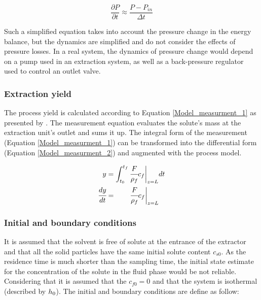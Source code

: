 \documentclass[../Article_Model_Parameters.tex]{subfiles}
\begin{document}
		{\footnotesize
			\begin{equation}
				\frac{\partial P}{\partial t} \approx \frac{P - P_{in} }{\Delta t}
		\end{equation}}
		
		Such a simplified equation takes into account the pressure change in the energy balance, but the dynamics are simplified and do not consider the effects of pressure losses. In a real system, the dynamics of pressure change would depend on a pump used in an extraction system, as well as a back-pressure regulator used to control an outlet valve.
  		  		
		\subsubsection{Extraction yield} \label{CH: Yield}
			
		The process yield is calculated according to Equation \ref{Model_measurment_1} as presented by \citet{Sovova1994a}. The measurement equation evaluates the solute's mass at the extraction unit's outlet and sums it up. The integral form of the measurement (Equation \ref{Model_measurment_1}) can be transformed into the differential form (Equation \ref{Model_measurment_2}) and augmented with the process model.
			
		{\footnotesize
			\begin{align} 
				\label{Model_measurment_1}
				y &= \int_{t_0}^{t_f} \cfrac{F}{\rho_f} c_f \biggr\rvert_{z=L} dt \\
				\cfrac{dy}{dt} &= \qquad \cfrac{F}{\rho_f} c_f \biggr\rvert_{z=L} 
                \label{Model_measurment_2}
		\end{align}	}
  
		\subsubsection{Initial and boundary conditions} 
		It is assumed that the solvent is free of solute at the entrance of the extractor and that all the solid particles have the same initial solute content $c_{s0}$. As the residence time is much shorter than the sampling time, the initial state estimate for the concentration of the solute in the fluid phase would be not reliable. Considering that it is assumed that the $c_{f0}=0$ and that the system is isothermal (described by ${\color{black}h_0}$). 
		The initial and boundary conditions are define as follow:
			
\end{document}
